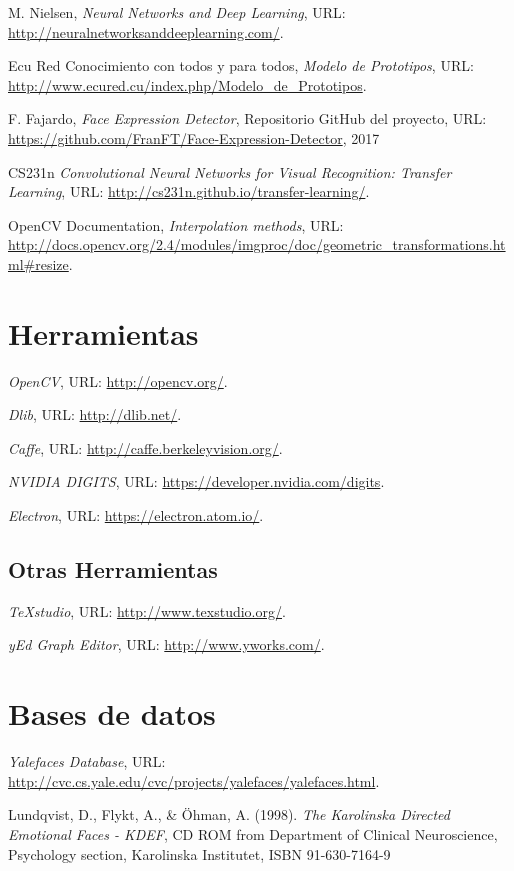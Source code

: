 \documentclass[a4paper,11pt]{book}
\begin{document}
\begin{thebibliography}{99}
	M. Nielsen,   
	\textit{Neural Networks and Deep Learning}, 
	URL: \url{http://neuralnetworksanddeeplearning.com/}.
	
	Ecu Red Conocimiento con todos y para todos,   
	\textit{Modelo de Prototipos}, 
	URL: \url{http://www.ecured.cu/index.php/Modelo_de_Prototipos}.
	
	F. Fajardo,   
	\textit{Face Expression Detector}, 
	Repositorio GitHub del proyecto, 
	URL: \url{https://github.com/FranFT/Face-Expression-Detector}, 
	2017
	
	CS231n  
	\textit{Convolutional Neural Networks for Visual Recognition: Transfer Learning}, 
	URL: \url{http://cs231n.github.io/transfer-learning/}.
	
	OpenCV Documentation,  
	\textit{Interpolation methods}, 
	URL: \url{	http://docs.opencv.org/2.4/modules/imgproc/doc/geometric_transformations.html#resize}.

	
	
	\section{Herramientas}
	\textit{OpenCV}, 
	URL: \url{http://opencv.org/}.
	
	\textit{Dlib}, 
	URL: \url{http://dlib.net/}.
	
	\textit{Caffe}, 
	URL: \url{http://caffe.berkeleyvision.org/}.
	
	\textit{NVIDIA DIGITS}, 
	URL: \url{https://developer.nvidia.com/digits}.
	
	\textit{Electron}, 
	URL: \url{https://electron.atom.io/}.
	
	\subsection{Otras Herramientas}
	\textit{TeXstudio}, 
	URL: \url{http://www.texstudio.org/}.
	
	\textit{yEd Graph Editor}, 
	URL: \url{http://www.yworks.com/}.
	
	\section{Bases de datos}
	\textit{Yalefaces Database}, 
	URL: \url{	http://cvc.cs.yale.edu/cvc/projects/yalefaces/yalefaces.html}.
	
	Lundqvist, D., Flykt, A., \& Öhman, A. (1998). %
	\textit{The Karolinska Directed Emotional Faces - KDEF}, %
	CD ROM from Department of Clinical Neuroscience, Psychology section, Karolinska Institutet, ISBN 91-630-7164-9
	
	

	
\end{thebibliography}
\end{document}
